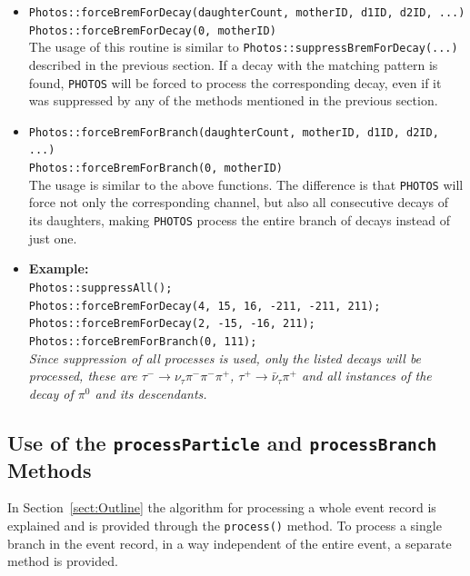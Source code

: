 \documentclass[]{Photos_interface_design}
\begin{document}
\begin{itemize}

 \item {\tt Photos::forceBremForDecay(daughterCount, motherID, d1ID, d2ID, ...)} \hfill \\
       {\tt Photos::forceBremForDecay(0, motherID)} \hfill \\
       The usage of this routine is similar to {\tt Photos::suppressBremForDecay(...)}
	   described in the previous section. If a decay with the matching pattern is found,
	   {\tt PHOTOS} will be forced to process the corresponding decay, even if it was suppressed
	   by any of the methods mentioned in the previous section.
 \item {\tt Photos::forceBremForBranch(daughterCount, motherID, d1ID, d2ID, ...)} \hfill \\
       {\tt Photos::forceBremForBranch(0, motherID)} \hfill \\
       The usage is similar to the above functions. The difference is
	   that {\tt PHOTOS} will force not only the corresponding channel,
	   but also all consecutive decays of its daughters, making {\tt PHOTOS} process the entire branch
	   of decays instead of just one.
 \item \textbf{Example:} \hfill \\
{\tt Photos::suppressAll(); } \\
{\tt Photos::forceBremForDecay(4, 15, 16, -211, -211, 211); } \\
{\tt Photos::forceBremForDecay(2, -15, -16, 211); } \\
{\tt Photos::forceBremForBranch(0, 111); } \\
\emph{Since suppression of all processes is used, only the listed decays will be processed,
      these are $\tau^- \rightarrow \nu_\tau \pi^- \pi^- \pi^+$, $\tau^+ \rightarrow \bar \nu_\tau \pi^+$
      and all instances of the decay of $\pi^0$ and its descendants.}
\end{itemize}

\subsection{Use of the {\tt processParticle} and {\tt processBranch} Methods}
\label{PHOTOSgun}

In Section~\ref{sect:Outline} the algorithm for processing a whole
event record is explained and is provided through the {\tt process()}
method.  To process a single branch in the event record, in a way
independent of the entire event, a separate method is provided.
\end{document}
